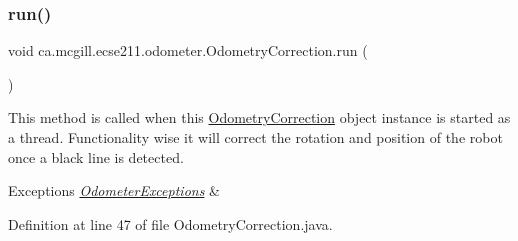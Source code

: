 \subsubsection{\texorpdfstring{run()}{run()}}
{\footnotesize\ttfamily void ca.\+mcgill.\+ecse211.\+odometer.\+Odometry\+Correction.\+run (\begin{DoxyParamCaption}{ }\end{DoxyParamCaption})}

This method is called when this \hyperlink{classca_1_1mcgill_1_1ecse211_1_1odometer_1_1_odometry_correction}{Odometry\+Correction} object instance is started as a thread. Functionality wise it will correct the rotation and position of the robot once a black line is detected.


\begin{DoxyExceptions}{Exceptions}
{\em \hyperlink{classca_1_1mcgill_1_1ecse211_1_1odometer_1_1_odometer_exceptions}{Odometer\+Exceptions}} & \\
\hline
\end{DoxyExceptions}


Definition at line 47 of file Odometry\+Correction.\+java.


